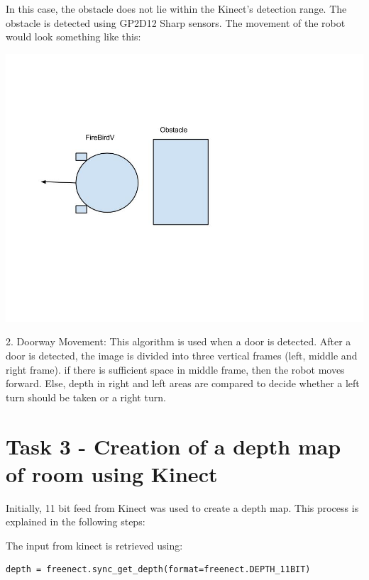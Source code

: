 \documentclass{report}
\begin{document}
In this case, the obstacle does not lie within the Kinect's detection range. 
The obstacle is detected using GP2D12 Sharp sensors. The movement of the robot would look something like this:
\begin{flushleft}
 

\includegraphics[width = 10CM]{Case_2.jpg}

\end{flushleft}

2. Doorway Movement:
This algorithm is used when a door is detected. After a door is detected, 
the image is divided into three vertical frames (left, middle and right frame). 
if there is sufficient space in middle frame, then the robot moves forward. Else, 
depth in right and left areas are compared to decide whether a left turn should be taken or a right turn.

\section{Task 3 - Creation of a depth map of room using Kinect}

Initially,  11 bit feed from Kinect was used to create a depth map. This process is explained in the following steps:

The input from kinect is retrieved using:

\begin{lstlisting}
depth = freenect.sync_get_depth(format=freenect.DEPTH_11BIT)

\end{lstlisting}
\end{document}
